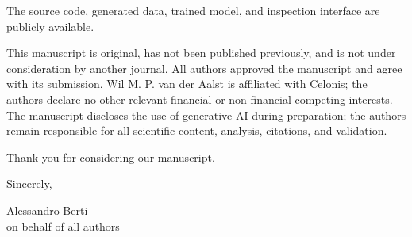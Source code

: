 \documentclass[10pt]{article}
\begin{document}
The source code, generated data, trained model, and inspection interface are publicly available.

This manuscript is original, has not been published previously, and is not under consideration by another journal. All authors approved the manuscript and agree with its submission. Wil M. P. van der Aalst is affiliated with Celonis; the authors declare no other relevant financial or non-financial competing interests. The manuscript discloses the use of generative AI during preparation; the authors remain responsible for all scientific content, analysis, citations, and validation.

Thank you for considering our manuscript.

Sincerely,

Alessandro Berti\\
on behalf of all authors
\end{document}

